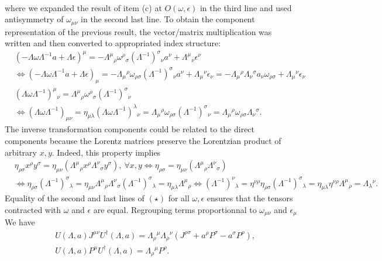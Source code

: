\documentclass[10pt, a4paper]{article}
\begin{document}
\begin{enumerate}
\begin{align*}
  \end{align*}
  where we expanded the result of item (c) at $O(\omega, \epsilon)$ in the third line and used antisymmetry of $\omega_{\mu\nu}$ in the second last line. To obtain the component representation of the previous result, the vector/matrix multiplication was written and then converted to appropriated index structure:
  \begin{align*}
    &(-\Lambda\omega \Lambda^{-1} a + \Lambda \epsilon)^\mu = -\Lambda^{\mu}{}_{\rho} \omega^{\rho}{}_{\sigma}  (\Lambda^{-1})^{\sigma}{}_{\nu} a^{\nu} + \Lambda^{\mu}{}_{\nu} \epsilon^{\nu}\\ &\iff (-\Lambda\omega \Lambda^{-1} a + \Lambda \epsilon)_\mu = -\Lambda_{\mu}{}^{\rho} \omega_{\rho\sigma}  (\Lambda^{-1})^{\sigma}{}_{\nu} a^{\nu} + \Lambda_{\mu}{}^{\nu} \epsilon_{\nu} =  -\Lambda_{\mu}{}^{\rho} \Lambda_{\nu}{}^{\sigma} a_{\nu} \omega_{\rho\sigma} + \Lambda_{\mu}{}^{\nu} \epsilon_{\nu}\\
    &(\Lambda \omega \Lambda^{-1})^{\mu}{}_{\nu} = \Lambda^{\mu}{}_{\rho}  \omega^{\rho}{}_{\sigma}  (\Lambda^{-1})^{\sigma}{}_{\nu}\\
    &\iff (\Lambda \omega \Lambda^{-1})_{\mu\nu} = \eta_{\mu\lambda} (\Lambda \omega \Lambda^{-1})^{\lambda}{}_{\nu} = \Lambda_{\mu}{}^{\rho}  \omega_{\rho\sigma}  (\Lambda^{-1})^{\sigma}{}_{\nu} = \Lambda_{\mu}{}^{\rho}  \omega_{\rho\sigma} \Lambda_{\nu}{}^{\sigma}.
  \end{align*}
  The inverse transformation components could be related to the direct components because the Lorentz matrices preserve the Lorentzian product of arbitrary $x, y$. Indeed, this property implies 
  \begin{align*}
    &\eta_{\rho \sigma} x^{\rho} y^{\sigma}= \eta_{\mu \nu}(\Lambda^{\mu}{}_{\rho} x^\rho  \Lambda^{\nu}{}_{\sigma} y^{\sigma}), \ \forall x, y \iff \eta_{\rho \sigma}= \eta_{\mu \nu}(\Lambda^{\mu}{}_{\rho} \Lambda^{\nu}{}_{\sigma}) \\
    &\iff \eta_{\rho \sigma} (\Lambda^{-1})^{\sigma}{}_{\lambda}= \eta_{\mu \nu} \Lambda^{\mu}{}_{\rho} \Lambda^{\nu}{}_{\sigma} (\Lambda^{-1})^{\sigma}{}_{\lambda} = \eta_{\mu \lambda} \Lambda^{\mu}{}_{\rho}
    \iff (\Lambda^{-1})^{\nu}{}_{\lambda} = \eta^{\nu \rho}\eta_{\rho \sigma} (\Lambda^{-1})^{\sigma}{}_{\lambda}= \eta_{\mu \lambda} \eta^{\nu \rho} \Lambda^{\mu}{}_{\rho} = \Lambda_{\lambda}{}^{\nu}.
  \end{align*}
  Equality of the second and last lines of $(\star)$ for all $\omega, \epsilon$ ensures that the tensors contracted with $\omega$ and $\epsilon$ are equal. Regrouping terms proportionnal to $\omega_{\mu\nu}$ and $\epsilon_\mu$ We have 
  \begin{align*}
   &U(\Lambda, a) J^{\mu\nu} U^{\dagger}(\Lambda, a) =\Lambda_\rho{ }^\mu \Lambda_\rho{ }^\nu\left(J^{\rho \sigma}+a^\rho P^\sigma-a^\sigma P^\rho\right), \\ &U(\Lambda, a) P^\mu U^{\dagger}(\Lambda, a) =\Lambda_\rho{ }^\mu P^\rho .
  \end{align*}


\end{enumerate}
\end{document}
